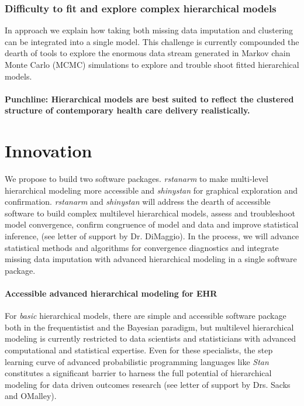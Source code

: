 \documentclass[11pt,notitlepage]{article}
\begin{document}
\section*{Difficulty to fit and explore complex hierarchical models}
In approach we explain  how taking both missing data imputation and clustering can be integrated into a single model. This challenge is currently compounded the dearth of tools to explore the enormous data stream generated in Markov chain Monte Carlo (MCMC) simulations to explore and trouble shoot fitted hierarchical models.  

\subsection*{Punchline: Hierarchical models  are best suited to reflect the clustered structure of contemporary health care delivery realistically.}

\part*{Innovation}

We propose to build two software packages. \textit{rstanarm} to make multi-level hierarchical modeling more accessible and \textit{shinystan} for graphical exploration and confirmation. \textit{rstanarm} and \textit{shinystan} will address the dearth of accessible software to build complex multilevel hierarchical models, assess and troubleshoot model convergence, confirm congruence of model and data and improve statistical inference, (see letter of support by Dr. DiMaggio). In the process, we will advance statistical methods and algorithms for convergence diagnostics and integrate missing data imputation with advanced hierarchical modeling in a single software package.  

\subsection*{Accessible advanced hierarchical modeling for EHR}

For \textit{basic} hierarchical models, there are simple and accessible software package both in the frequentistist and the Bayesian paradigm, but multilevel hierarchical modeling is currently restricted to data scientists and statisticians with advanced computational and statistical expertise. Even for these specialists, the step learning curve of advanced probabilistic programming languages like \textit{Stan} constitutes a significant barrier to harness the full potential of hierarchical modeling for data driven outcomes research (see letter of support by Drs. Sacks and OMalley).
\end{document}
